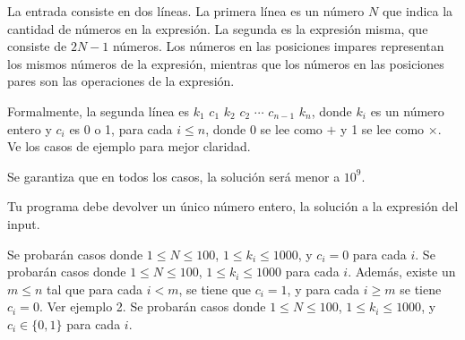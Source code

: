 \documentclass{oci}
\begin{document}
\begin{inputDescription}
La entrada consiste en dos líneas. La primera línea es un número $N$ que indica la cantidad de números en la expresión. La segunda es la expresión misma, que consiste de $2N-1$ números. Los números en las posiciones impares representan los mismos números de la expresión, mientras que los números en las posiciones pares son las operaciones de la expresión. 

Formalmente, la segunda línea es $k_1$ $c_1$ $k_2$ $c_2$ $\cdots$ $c_{n-1}$ $k_n$, donde $k_i$ es un número entero y $c_i$ es 0 o 1, para cada $i \leq n$, donde 0 se lee como $+$ y 1 se lee como $\times$. Ve los casos de ejemplo para mejor claridad.

Se garantiza que en todos los casos, la solución será menor a $10^9$.
\end{inputDescription}

\begin{outputDescription}
Tu programa debe devolver un único número entero, la solución a la expresión del input.
\end{outputDescription}

\begin{scoreDescription}
   Se probarán casos donde $1 \leq N \leq 100$, $1\leq k_i \leq 1000$, y $c_i = 0$ para cada $i$.
   Se probarán casos donde $1 \leq N \leq 100$, $1\leq k_i \leq 1000$ para cada $i$. Además, existe un $m \leq n$ tal que para cada $i < m$, se tiene que $c_i = 1$, y para cada $i \geq m$ se tiene $c_i = 0$. Ver ejemplo 2.
   Se probarán casos donde $1 \leq N \leq 100$, $1\leq k_i \leq 1000$, y $c_i \in \{0,1\}$ para cada $i$.
\end{scoreDescription}

\begin{sampleDescription}
\end{sampleDescription}
\end{document}
